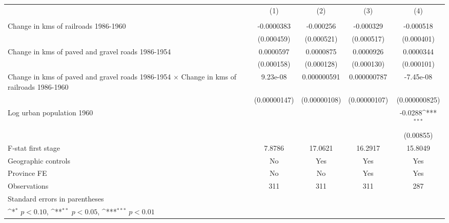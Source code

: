{
\def\sym#1{\ifmmode^{#1}\else\(^{#1}\)\fi}
\begin{tabular}{l*{4}{c}}
\hline\hline
                &\multicolumn{1}{c}{(1)}&\multicolumn{1}{c}{(2)}&\multicolumn{1}{c}{(3)}&\multicolumn{1}{c}{(4)}\\
                &\multicolumn{1}{c}{}&\multicolumn{1}{c}{}&\multicolumn{1}{c}{}&\multicolumn{1}{c}{}\\
\hline
Change in kms of railroads 1986-1960&-0.0000383         &-0.000256         &-0.000329         &-0.000518         \\
                &(0.000459)         &(0.000521)         &(0.000517)         &(0.000401)         \\
[1em]
Change in kms of paved and gravel roads 1986-1954&0.0000597         &0.0000875         &0.0000926         &0.0000344         \\
                &(0.000158)         &(0.000128)         &(0.000130)         &(0.000101)         \\
[1em]
Change in kms of paved and gravel roads 1986-1954 $\times$ Change in kms of railroads 1986-1960& 9.23e-08         &0.000000591         &0.000000787         &-7.45e-08         \\
                &(0.00000147)         &(0.00000108)         &(0.00000107)         &(0.000000825)         \\
[1em]
Log urban population 1960&                  &                  &                  &  -0.0288\sym{***}\\
                &                  &                  &                  &(0.00855)         \\
\hline
F-stat first stage&   7.8786         &  17.0621         &  16.2917         &  15.8049         \\
Geographic controls&       No         &      Yes         &      Yes         &      Yes         \\
Province FE     &       No         &       No         &      Yes         &      Yes         \\
Observations    &      311         &      311         &      311         &      287         \\
\hline\hline
\multicolumn{5}{l}{\footnotesize Standard errors in parentheses}\\
\multicolumn{5}{l}{\footnotesize \sym{*} \(p<0.10\), \sym{**} \(p<0.05\), \sym{***} \(p<0.01\)}\\
\end{tabular}
}
